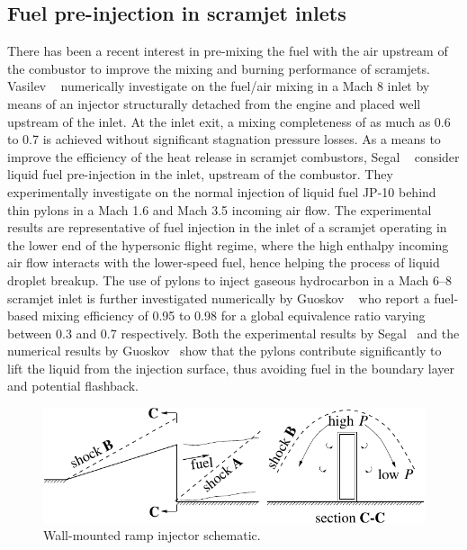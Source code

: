 \subsection{Fuel pre-injection in scramjet inlets}


There has been a recent interest in pre-mixing the fuel with the air
upstream of the combustor to improve the mixing and burning performance  of
scramjets. Vasilev \etal\ \cite{aiaa:1994:vasilev} numerically investigate
on the fuel/air mixing in a Mach 8 inlet by means of an injector structurally detached
from the engine and placed well upstream of the inlet.
At the inlet exit,
a mixing completeness of as much as 0.6 to 0.7 is achieved without significant
stagnation pressure losses.
As a means to improve the efficiency of the heat release in scramjet combustors,
Segal \etal\ \cite{aiaa:2000:livingston,jpp:2001:owens} consider liquid
fuel pre-injection in the inlet, upstream of the combustor. They
experimentally investigate on the normal injection of
liquid fuel JP-10 behind thin pylons in a  Mach 1.6 and Mach 3.5
incoming air flow. The experimental results are representative of fuel injection
in the inlet
of a  scramjet operating in the lower end of the hypersonic flight regime,
where the high enthalpy incoming air flow interacts with the lower-speed fuel,
hence helping the process of liquid droplet breakup.
The use of pylons to inject gaseous hydrocarbon in a Mach 6--8
scramjet inlet is further investigated numerically by Guoskov \etal\
\cite{jpp:2001:guoskov}
who report a fuel-based mixing efficiency of 0.95 to 0.98 for
a global equivalence ratio varying between 0.3 and 0.7 respectively.
Both the experimental results by Segal \etal\ and the numerical results
by Guoskov \etal\ show that the pylons contribute
significantly to lift the liquid from the
injection surface, thus avoiding fuel in the boundary layer and potential
flashback.

%
\begin{figure}[!b]
   \center
   \includegraphics[width=4.6\lengthfigure]{fig1/ramp.pdf}
   \caption{Wall-mounted ramp injector schematic.}
   \label{fig:ramp-schema}
\end{figure}
%




